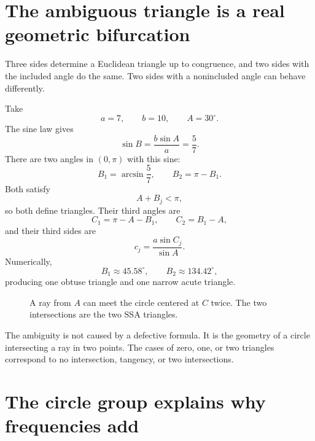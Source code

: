 \section{The ambiguous triangle is a real geometric bifurcation}

Three sides determine a Euclidean triangle up to congruence, and two sides with the included angle do the same.  Two sides with a nonincluded angle can behave differently.

Take
\[
  a=7,
  \qquad
  b=10,
  \qquad
  A=30^\circ.
\]
The sine law gives
\[
  \sin B
  =\frac{b\sin A}{a}
  =\frac57.
\]
There are two angles in \((0,\pi)\) with this sine:
\[
  B_1=\arcsin\frac57,
  \qquad
  B_2=\pi-B_1.
\]
Both satisfy
\[
  A+B_j<\pi,
\]
so both define triangles.  Their third angles are
\[
  C_1=\pi-A-B_1,
  \qquad
  C_2=B_1-A,
\]
and their third sides are
\[
  c_j=\frac{a\sin C_j}{\sin A}.
\]
Numerically,
\[
  B_1\approx45.58^\circ,
  \qquad
  B_2\approx134.42^\circ,
\]
producing one obtuse triangle and one narrow acute triangle.

\begin{figure}[H]
\centering
{}
\caption{A ray from \(A\) can meet the circle centered at \(C\) twice.  The two intersections are the two SSA triangles.}
\end{figure}

The ambiguity is not caused by a defective formula.  It is the geometry of a circle intersecting a ray in two points.  The cases of zero, one, or two triangles correspond to no intersection, tangency, or two intersections.

\section{The circle group explains why frequencies add}

